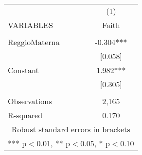 \begin{tabular}{lc} \hline
 & (1) \\
VARIABLES & Faith \\ \hline
 &  \\
ReggioMaterna & -0.304*** \\
 & [0.058] \\
Constant & 1.982*** \\
 & [0.305] \\
 &  \\
Observations & 2,165 \\
 R-squared & 0.170 \\ \hline
\multicolumn{2}{c}{ Robust standard errors in brackets} \\
\multicolumn{2}{c}{ *** p$<$0.01, ** p$<$0.05, * p$<$0.10} \\
\end{tabular}
